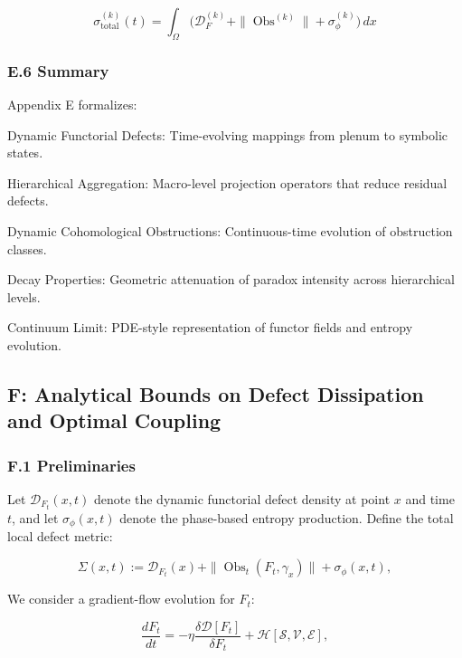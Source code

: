 \documentclass[12pt]{article}
\theoremstyle{plain}
\begin{document}
\begin{equation}
\sigma_\mathrm{total}^{(k)}(t) = \int_{\Omega} \Big( \mathcal{D}_{F}^{(k)} + \|\operatorname{Obs}^{(k)}\| + \sigma_\phi^{(k)} \Big) \, dx
\end{equation}

\subsubsection*{E.6 Summary}

Appendix E formalizes:

Dynamic Functorial Defects: Time-evolving mappings from plenum to symbolic states.

Hierarchical Aggregation: Macro-level projection operators that reduce residual defects.

Dynamic Cohomological Obstructions: Continuous-time evolution of obstruction classes.

Decay Properties: Geometric attenuation of paradox intensity across hierarchical levels.

Continuum Limit: PDE-style representation of functor fields and entropy evolution.

\subsection*{F: Analytical Bounds on Defect Dissipation and Optimal Coupling}

\subsubsection*{F.1 Preliminaries}

Let \(\mathcal{D}_{F_t}(x,t)\) denote the dynamic functorial defect density at point \(x\) and time \(t\), and let \(\sigma_\phi(x,t)\) denote the phase-based entropy production. Define the total local defect metric:

\begin{equation}
\Sigma(x,t) := \mathcal{D}_{F_t}(x) + \|\operatorname{Obs}_t(F_t, \gamma_x)\| + \sigma_\phi(x,t),
\end{equation}

We consider a gradient-flow evolution for \(F_t\):

\begin{equation}
\frac{d F_t}{dt} = - \eta \frac{\delta \mathcal{D}[F_t]}{\delta F_t} + \mathcal{H}[\mathcal{S}, \mathcal{V}, \mathcal{E}],
\end{equation}
\end{document}
